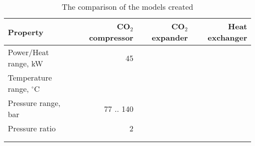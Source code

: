 \begin{table}
\label{tab:DiscussionComparison}
\caption{The comparison of the models created}
\begin{center}
\begin{tabulary}{0.9\textwidth}{LRRR}
\toprule
Property    	                &	CO$_2$ compressor   & CO$_2$	expander    & Heat exchanger    \\
\midrule
Power/Heat range, kW            &       45              &                       &                   \\
Temperature range, $^\circ$C    &                       &                       &                   \\
Pressure range, bar             &   77 .. 140           &                       &                   \\
Pressure ratio                  &   2                   &                       &                   \\
& & & \\
& & & \\
\bottomrule
\end{tabulary}
\end{center}
\end{table}